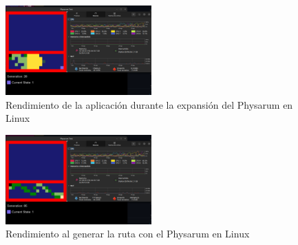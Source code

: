     \vskip 0.5cm
    \begin{figure}[htbp]
        \centering
        \includegraphics[width=0.5\textwidth]{./images/Pruebas/simulador/image055.png}
        \caption{Rendimiento de la aplicaci\'on durante la expansi\'on del Physarum en Linux}
        \label{fig:Ruta 55}
    \end{figure}
    \vskip 0.5cm
    \begin{figure}[htbp]
        \centering
        \includegraphics[width=0.5\textwidth]{./images/Pruebas/simulador/image057.png}
        \caption{Rendimiento al generar la ruta con el Physarum en Linux}
        \label{fig:Ruta 57}
    \end{figure}